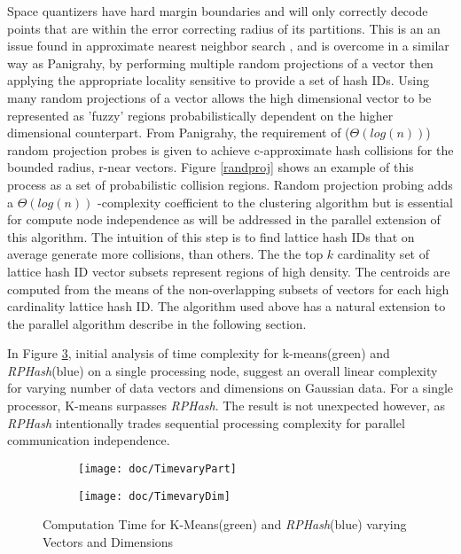 \documentclass[a4paper,10pt]{article}
\begin{document}
Space quantizers have hard margin boundaries and will only correctly
decode points that are within the error correcting radius of its
partitions.  This is an an issue found in approximate nearest neighbor
search \cite{panigrahy,Andoni}, and is overcome in a similar way as
Panigrahy\cite{panigrahy}, by performing multiple random projections
of a vector then applying the appropriate locality sensitive to
provide a set of hash IDs.  Using many random projections of a vector
allows the high dimensional vector to be represented as 'fuzzy' regions
probabilistically dependent on the higher dimensional counterpart.  From
Panigrahy\cite{panigrahy}, the requirement of ($\Theta(log(n))$) random
projection probes is given to achieve c-approximate hash collisions for the
bounded radius, r-near vectors.  Figure \ref{randproj} shows an example of
this process as a set of probabilistic collision regions.  Random projection
probing adds a $\Theta(log(n))$ -complexity coefficient to the clustering
algorithm but is essential for compute node independence as will be addressed
in the parallel extension of this algorithm.  The intuition of this step is to
find lattice hash IDs that on average generate more collisions, than others.
The the top $k$ cardinality set of lattice hash ID vector subsets represent
regions of high density.  The centroids are computed from the means of the
non-overlapping subsets of vectors for each high cardinality lattice hash ID.
The algorithm used above has a natural extension to the parallel algorithm
describe in the following section.

In Figure \ref{timecomplex}, initial analysis of time complexity for 
k-means(green)
and \emph{RPHash}(blue) on a single processing node, suggest an overall linear complexity
for varying number of data vectors and dimensions on Gaussian data. For a 
single processor, K-means surpasses \emph{RPHash}. The result is not unexpected
however, as \emph{RPHash} intentionally trades sequential processing complexity
for parallel communication independence. 
\begin{figure}
        \centering
        \begin{subfigure}[b]{0.49\textwidth}
                \texttt{[image: doc/TimevaryPart]}
                \label{TimePart}
        \end{subfigure}
        \begin{subfigure}[b]{0.49\textwidth}
                \texttt{[image: doc/TimevaryDim]}
                \label{TimeDim}
        \end{subfigure}
	  \caption{Computation Time for K-Means(green) and \emph{RPHash}(blue) 
               varying Vectors and Dimensions}\label{timecomplex}
\end{figure}
\end{document}
